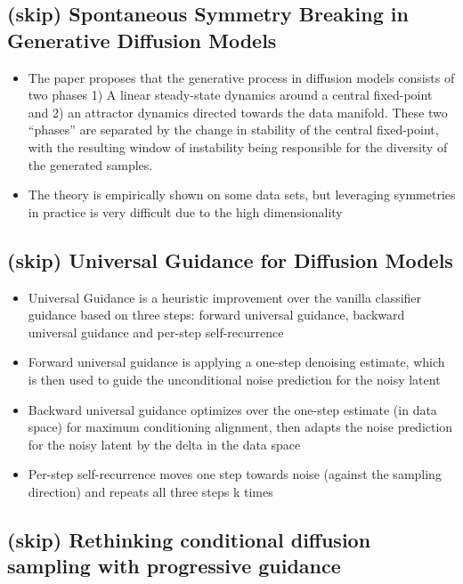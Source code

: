 \documentclass{article}
\begin{document}
\subsection{(skip) Spontaneous Symmetry Breaking in Generative Diffusion Models}

\begin{itemize}
\item The paper proposes that the generative process in diffusion models consists of two phases 1) A linear steady-state dynamics around a central fixed-point and 2) an attractor dynamics directed towards the data manifold. These two “phases” are separated by the change in stability of the central fixed-point, with the resulting window of instability being responsible for the diversity of the generated samples.
\item The theory is empirically shown on some data sets, but leveraging symmetries in practice is very difficult due to the high dimensionality
\end{itemize}

\subsection{(skip) Universal Guidance for Diffusion Models}

\begin{itemize}
    \item Universal Guidance is a heuristic improvement over the vanilla classifier guidance based on three steps: forward universal guidance, backward universal guidance and per-step self-recurrence
    \item Forward universal guidance is applying a one-step denoising estimate, which is then used to guide the unconditional noise prediction for the noisy latent
    \item Backward universal guidance optimizes over the one-step estimate (in data space) for maximum conditioning alignment, then adapts the noise prediction for the noisy latent by the delta in the data space
    \item Per-step self-recurrence moves one step towards noise (against the sampling direction) and repeats all three steps k times
\end{itemize}

\subsection{(skip) Rethinking conditional diffusion sampling with progressive guidance}
\end{document}
